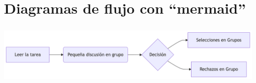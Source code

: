 \documentclass[
  letterpaper,
  DIV=11,
  numbers=noendperiod]{scrartcl}
\begin{document}
\begin{table}

\caption{\label{tbl-example2}Ejemplo de subtablas}

\begin{minipage}{0.50\linewidth}



\end{minipage}%
%
\begin{minipage}{0.50\linewidth}



\end{minipage}%

\end{table}%

\section{Diagramas de flujo con
``mermaid''}\label{diagramas-de-flujo-con-mermaid}

\includegraphics[width=6in,height=1.19in]{practica01c_files/figure-latex/mermaid-figure-1.png}
\end{document}
